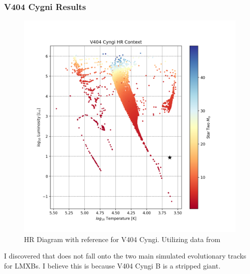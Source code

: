 \documentclass[12pt, a4paper]{article}
\begin{document}
        \subsubsection{V404 Cygni Results}
            \begin{figure}[H] 
                \centering
                \includegraphics[scale = .6]{figs/GeneratedFigs/V404_Cyngi/V404XBsPopulationHRComp.png}
                \caption{HR Diagram with reference for V404 Cyngi. Utilizing data from \cite{Bartolomeo_2023}}
                \label{V404Context}
            \end{figure}

            I discovered that does not fall onto the two main simulated evolutionary tracks for LMXBs. I believe this is because V404 Cyngi B is a stripped giant. \cite{Haardt_1993}
            

\end{document}
